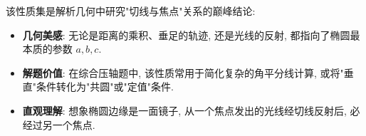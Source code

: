 \begin{explanationbox}
该性质集是解析几何中研究"切线与焦点"关系的巅峰结论:
\begin{itemize}
    \item \textbf{几何美感}: 无论是距离的乘积、垂足的轨迹, 还是光线的反射, 都指向了椭圆最本质的参数 $a, b, c$.
    \item \textbf{解题价值}: 在综合压轴题中, 该性质常用于简化复杂的角平分线计算, 或将"垂直"条件转化为"共圆"或"定值"条件.
    \item \textbf{直观理解}: 想象椭圆边缘是一面镜子, 从一个焦点发出的光线经切线反射后, 必经过另一个焦点.
\end{itemize}
\end{explanationbox}